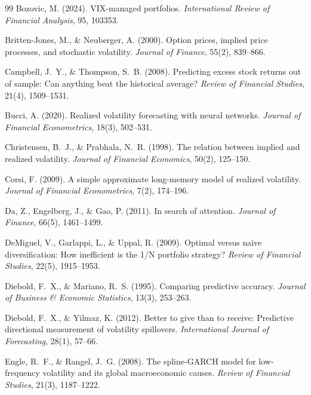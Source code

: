 \documentclass[12pt,a4paper]{article}
\begin{document}
\begin{thebibliography}{99}
Bozovic, M. (2024). VIX-managed portfolios. \textit{International Review of Financial Analysis}, 95, 103353.

Britten-Jones, M., \& Neuberger, A. (2000). Option prices, implied price processes, and stochastic volatility. \textit{Journal of Finance}, 55(2), 839--866.

Campbell, J.~Y., \& Thompson, S.~B. (2008). Predicting excess stock returns out of sample: Can anything beat the historical average? \textit{Review of Financial Studies}, 21(4), 1509--1531.

Bucci, A. (2020). Realized volatility forecasting with neural networks. \textit{Journal of Financial Econometrics}, 18(3), 502--531.

Christensen, B.~J., \& Prabhala, N.~R. (1998). The relation between implied and realized volatility. \textit{Journal of Financial Economics}, 50(2), 125--150.

Corsi, F. (2009). A simple approximate long-memory model of realized volatility. \textit{Journal of Financial Econometrics}, 7(2), 174--196.

Da, Z., Engelberg, J., \& Gao, P. (2011). In search of attention. \textit{Journal of Finance}, 66(5), 1461--1499.

DeMiguel, V., Garlappi, L., \& Uppal, R. (2009). Optimal versus naive diversification: How inefficient is the 1/N portfolio strategy? \textit{Review of Financial Studies}, 22(5), 1915--1953.

Diebold, F.~X., \& Mariano, R.~S. (1995). Comparing predictive accuracy. \textit{Journal of Business \& Economic Statistics}, 13(3), 253--263.

Diebold, F.~X., \& Yilmaz, K. (2012). Better to give than to receive: Predictive directional measurement of volatility spillovers. \textit{International Journal of Forecasting}, 28(1), 57--66.

Engle, R.~F., \& Rangel, J.~G. (2008). The spline-GARCH model for low-frequency volatility and its global macroeconomic causes. \textit{Review of Financial Studies}, 21(3), 1187--1222.


\end{thebibliography}
\end{document}
